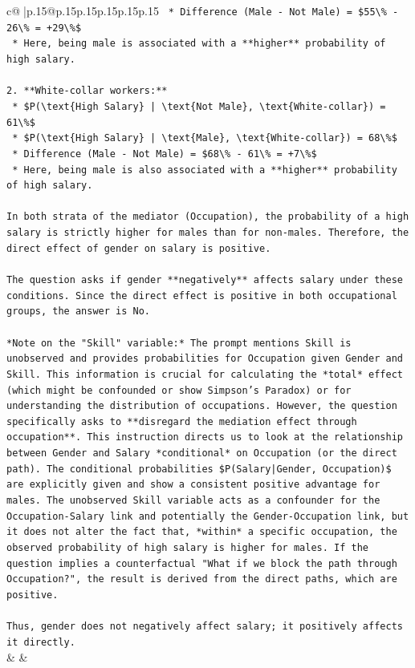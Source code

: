 \documentclass{article}
\begin{document}
{\begin{supertabular}{c@{$\;$}|p{.15\linewidth}@{}p{.15\linewidth}p{.15\linewidth}p{.15\linewidth}p{.15\linewidth}p{.15\linewidth}}
{{{\texttt{    *   Difference (Male {-} Not Male) = \$55\textbackslash{}\% {-} 26\textbackslash{}\% = +29\textbackslash{}\%\$} \\
\texttt{    *   Here, being male is associated with a **higher** probability of high salary.} \\
\\ 
\texttt{2.  **White{-}collar workers:**} \\
\texttt{    *   \$P(\textbackslash{}text\{High Salary\} | \textbackslash{}text\{Not Male\}, \textbackslash{}text\{White{-}collar\}) = 61\textbackslash{}\%\$} \\
\texttt{    *   \$P(\textbackslash{}text\{High Salary\} | \textbackslash{}text\{Male\}, \textbackslash{}text\{White{-}collar\}) = 68\textbackslash{}\%\$} \\
\texttt{    *   Difference (Male {-} Not Male) = \$68\textbackslash{}\% {-} 61\textbackslash{}\% = +7\textbackslash{}\%\$} \\
\texttt{    *   Here, being male is also associated with a **higher** probability of high salary.} \\
\\ 
\texttt{In both strata of the mediator (Occupation), the probability of a high salary is strictly higher for males than for non{-}males. Therefore, the direct effect of gender on salary is positive.} \\
\\ 
\texttt{The question asks if gender **negatively** affects salary under these conditions. Since the direct effect is positive in both occupational groups, the answer is No.} \\
\\ 
\texttt{*Note on the "Skill" variable:* The prompt mentions Skill is unobserved and provides probabilities for Occupation given Gender and Skill. This information is crucial for calculating the *total* effect (which might be confounded or show Simpson's Paradox) or for understanding the distribution of occupations. However, the question specifically asks to **disregard the mediation effect through occupation**. This instruction directs us to look at the relationship between Gender and Salary *conditional* on Occupation (or the direct path). The conditional probabilities \$P(Salary|Gender, Occupation)\$ are explicitly given and show a consistent positive advantage for males. The unobserved Skill variable acts as a confounder for the Occupation{-}Salary link and potentially the Gender{-}Occupation link, but it does not alter the fact that, *within* a specific occupation, the observed probability of high salary is higher for males. If the question implies a counterfactual "What if we block the path through Occupation?", the result is derived from the direct paths, which are positive.} \\
\\ 
\texttt{Thus, gender does not negatively affect salary; it positively affects it directly.} \\
            }
        }
    }
    & & \\ \\


\end{supertabular}}
\end{document}
